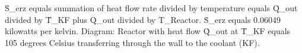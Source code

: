 Ṡ_erz equals summation of heat flow rate divided by temperature equals Q̇_out divided by T̄_KF plus Q̇_out divided by T_Reactor.  
Ṡ_erz equals 0.06049 kilowatts per kelvin.  
Diagram: Reactor with heat flow Q̇_out at T̄_KF equals 105 degrees Celsius transferring through the wall to the coolant (KF).